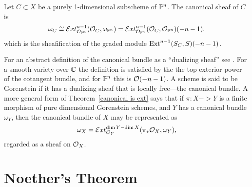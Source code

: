 %
%
 
\begin{theorem}\label{canonical is ext}
Let $C\subset X$ be a purely 1-dimensional subscheme of $\PP^{n}$. The canonical sheaf of $C$ is 
$$
\omega_{C} \cong \sExt^{n-1}_{\sO_{\PP^{n}}}(\sO_{C}, \omega_{\PP^{n}}) = 
\sExt^{n-1}_{\sO_{\PP^{n}}}(\sO_{C}, \sO_{\PP^{n}})(-n-1).
$$
which is the sheafification of the graded module $\Ext^{n-1}(S_{C},S)(-n-1)$.
\end{theorem}

\begin{fact}
For an abstract definition of the canonical bundle as a ``dualizing sheaf'' see \cite{AltmanKleiman}. For a smooth variety over $\CC$ the definition is satisfied by the the top exterior power of the cotangent bundle, and for $\PP^{n}$ this is $\sO(-n-1)$. A scheme is said to be Gorenstein if it has a dualizing sheaf that is locally free---the canonical bundle. A more general form of Theorem~\ref{canonical is ext} says that if $\pi: X -> Y$ is a finite morphism of pure dimensional Gorenstein schemes, and $Y$ has a canonical bundle $\omega_{Y}$, then the canonical bundle of $X$ may be
represented as 
$$
\omega_{X} = \sExt^{\dim Y-\dim X}_{\sO_{Y}}
(\pi_{*}\sO_{X}, \omega_{Y}),
$$ 
regarded as a sheaf on $\sO_{X}$.
\end{fact}

\section{Noether's Theorem}\label{sec:canonical curves} 

